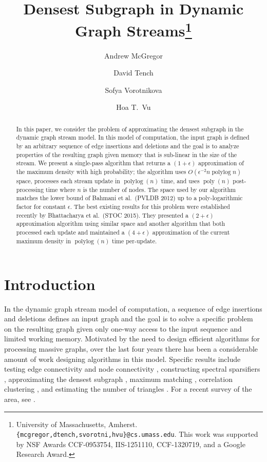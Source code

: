 \documentclass[11pt]{article}
\date{}
\DeclareMathOperator{\polylog}{polylog}
\DeclareMathOperator{\poly}{poly}
\begin{document}
\title{Densest Subgraph in Dynamic Graph Streams\thanks{University of Massachusetts, Amherst. 
\texttt{\{mcgregor,dtench,svorotni,hvu\}@cs.umass.edu}. This work was supported by NSF  Awards CCF-0953754, IIS-1251110,  CCF-1320719, and a Google Research Award.}}
\author{
Andrew McGregor
 \and 
David Tench
 \and 
Sofya Vorotnikova
 \and 
Hoa T.~Vu }
\maketitle

\begin{abstract}
In this paper, we consider the problem of approximating the densest subgraph in the dynamic graph stream model. In this model of computation, the input graph is defined by an arbitrary sequence of edge insertions and deletions and the goal is to analyze properties of the resulting graph given memory that is sub-linear in the size of the stream.
We present a single-pass algorithm that returns a $(1+\epsilon)$ approximation of the maximum density with high probability; the algorithm uses $O(\epsilon^{-2} n \polylog n)$ space, processes each stream update in $\polylog (n)$ time, and uses $\poly(n)$ post-processing time where $n$ is the number of nodes.  The space used by our algorithm matches the lower bound of Bahmani  et al.~(PVLDB 2012) up to a poly-logarithmic factor for constant $\epsilon$. The best existing results  for this problem were established recently by Bhattacharya et al.~(STOC 2015). They presented a $(2+\epsilon)$ approximation algorithm using similar space and another algorithm that both processed each update and maintained a $(4+\epsilon)$ approximation of the current maximum density in $\polylog (n)$ time per-update. 
\end{abstract}

\section{Introduction}
In the dynamic graph stream model of computation, a sequence of edge insertions and deletions defines an input graph and the goal is to solve a specific problem on the resulting graph given only one-way access to the input sequence and limited working memory. Motivated by the need to design efficient algorithms for processing massive graphs, over the last four years there has been a considerable amount of work designing algorithms in this model\cite{AhnCGMW15,AhnGM12a,AhnGM12b,AhnGM13,KapralovLMMS14,KapralovW14,GoelKP12,KutzkovP14a,GuhaMT15,BhattacharyaHNT15,ChitnisCEHMMV15,AssadiKLY15,Konrad15,BuryS15a}. Specific results include testing edge connectivity \cite{AhnGM12b} and node connectivity \cite{GuhaMT15}, constructing spectral sparsifiers \cite{KapralovLMMS14}, approximating the densest subgraph \cite{BhattacharyaHNT15}, maximum matching \cite{ChitnisCEHMMV15,AssadiKLY15,Konrad15,BuryS15a}, correlation clustering \cite{AhnCGMW15}, and estimating the number of triangles \cite{KutzkovP14a}. For a recent survey of the area, see \cite{McGregor14}. 
\end{document}

